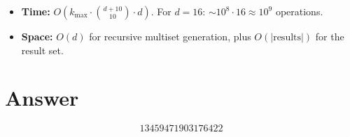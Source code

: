 \documentclass[11pt]{article}
\theoremstyle{definition}
\begin{document}
\begin{itemize}
\item \textbf{Time:} $O\!\left(k_{\max}\cdot\binom{d+10}{10}\cdot d\right)$. For $d=16$: $\sim 10^8 \cdot 16 \approx 10^9$ operations.
\item \textbf{Space:} $O(d)$ for recursive multiset generation, plus $O(|\text{results}|)$ for the result set.
\end{itemize}

\section{Answer}

\[
\boxed{13459471903176422}
\]
\end{document}
